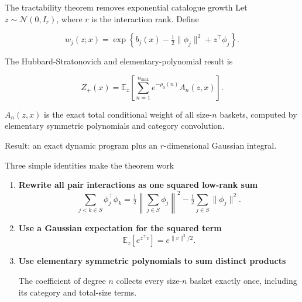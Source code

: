 \documentclass[aspectratio=169,11pt,t]{beamer}
\newcommand{\blue}[1]{\textcolor{Accent}{#1}}
\begin{document}
\begin{frame}{The tractability theorem removes exponential catalogue growth}
\small
Let $z\sim\mathcal N(0,I_r)$, where $r$ is the interaction rank. Define

\[
w_j(z;x)=\exp\!\left\{b_j(x)-\tfrac12\|\phi_j\|^2+z^{\top}\phi_j\right\}.
\]

The Hubbard-Stratonovich and elementary-polynomial result is

\[
\boxed{
Z_{+}(x)=
\mathbb E_z\!\left[
\sum_{n=1}^{n_{\max}}e^{-\rho_0(n)}A_n(z,x)
\right].
}
\]

$A_n(z,x)$ is the exact total conditional weight of all size-$n$ baskets, computed by
elementary symmetric polynomials and category convolution.

\begin{center}
\blue{Result: an exact dynamic program plus an $r$-dimensional Gaussian integral.}
\end{center}
\end{frame}

\begin{frame}{Three simple identities make the theorem work}
\begin{enumerate}
  \item \textbf{Rewrite all pair interactions as one squared low-rank sum}
  \[
  \sum_{j<k\in S}\phi_j^{\top}\phi_k
  =\tfrac12\left\|\sum_{j\in S}\phi_j\right\|^2
  -\tfrac12\sum_{j\in S}\|\phi_j\|^2.
  \]

  \item \textbf{Use a Gaussian expectation for the squared term}
  \[
  \mathbb E_z[e^{z^{\top}v}]=e^{\|v\|^2/2}.
  \]

  \item \textbf{Use elementary symmetric polynomials to sum distinct products}

  The coefficient of degree $n$ collects every size-$n$ basket exactly once, including
  its category and total-size terms.
\end{enumerate}
\end{frame}
\end{document}
